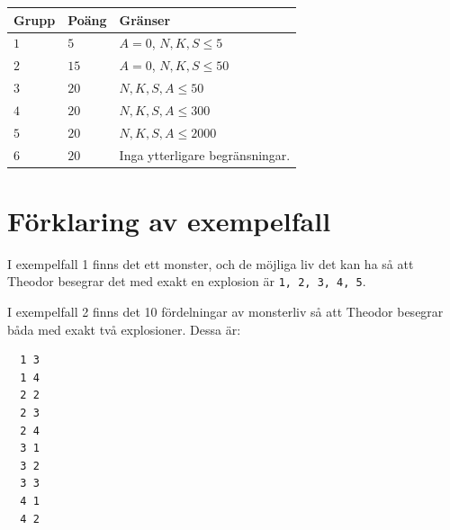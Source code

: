 \noindent
\begin{tabular}{| l | l | p{12cm} |}
  \hline
  \textbf{Grupp} & \textbf{Poäng} & \textbf{Gränser} \\ \hline
  $1$    & $5$        & $A = 0$, $N, K, S \leq 5$ \\ \hline
  $2$    & $15$       & $A = 0$, $N, K, S \leq 50$ \\ \hline
  $3$    & $20$       & $N, K, S, A \leq 50$ \\ \hline
  $4$    & $20$       & $N, K, S, A \leq 300$ \\ \hline
  $5$    & $20$       & $N, K, S, A \leq 2000$ \\ \hline
  $6$    & $20$       & Inga ytterligare begränsningar. \\ \hline
\end{tabular}

\section*{Förklaring av exempelfall}
I exempelfall 1 finns det ett monster, och de möjliga liv det kan ha så att Theodor besegrar det med exakt en
explosion är \verb+1, 2, 3, 4, 5+.


I exempelfall 2 finns det 10 fördelningar av monsterliv så att Theodor besegrar båda med exakt två explosioner.
Dessa är:
\begin{verbatim}
  1 3
  1 4
  2 2
  2 3
  2 4
  3 1
  3 2
  3 3
  4 1
  4 2
\end{verbatim}
